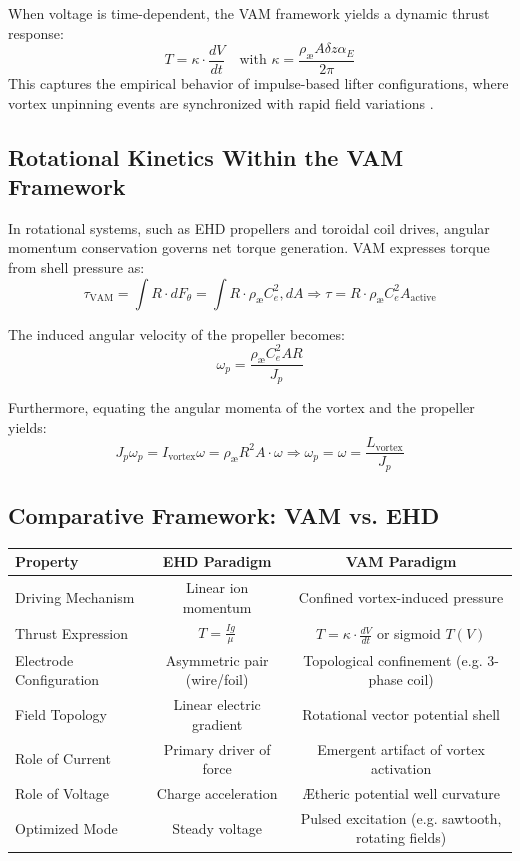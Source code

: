 \documentclass[a4paper,12pt]{article}
\begin{document}
When voltage is time-dependent, the VAM framework yields a dynamic thrust response:
\begin{equation}
\boxed{
T = \kappa \cdot \frac{dV}{dt}
\quad \text{with } \kappa = \frac{\rho_\text{\ae} A \delta z \alpha_E}{2\pi}
}
\end{equation}
This captures the empirical behavior of impulse-based lifter configurations, where vortex unpinning events are synchronized with rapid field variations \cite{vamthrustfit2025}.


\subsection{Rotational Kinetics Within the VAM Framework}
In rotational systems, such as EHD propellers and toroidal coil drives, angular momentum conservation governs net torque generation. VAM expresses torque from shell pressure as:
\begin{equation}
\tau_\text{VAM} = \int R \cdot dF_\theta = \int R \cdot \rho_\text{\ae} C_e^2 , dA \Rightarrow \tau = R \cdot \rho_\text{\ae} C_e^2 A_\text{active}
\end{equation}


The induced angular velocity of the propeller becomes:
\begin{equation}
\boxed{
\omega_p = \frac{\rho_\text{\ae} C_e^2 A R}{J_p}
}
\end{equation}


Furthermore, equating the angular momenta of the vortex and the propeller yields:
\begin{equation}
J_p \omega_p = I_\text{vortex} \omega = \rho_\text{\ae} R^2 A \cdot \omega
\Rightarrow \boxed{
\omega_p = \omega = \frac{L_\text{vortex}}{J_p}
}
\end{equation}


\subsection{Comparative Framework: VAM vs. EHD}
\begin{center}
\begin{tabular}{|l|c|c|}
\hline
\textbf{Property} & \textbf{EHD Paradigm} & \textbf{VAM Paradigm} \\
\hline
Driving Mechanism & Linear ion momentum & Confined vortex-induced pressure \\
Thrust Expression & $T = \frac{Ig}{\mu}$ & $T = \kappa \cdot \frac{dV}{dt}$ or sigmoid $T(V)$ \\
Electrode Configuration & Asymmetric pair (wire/foil) & Topological confinement (e.g. 3-phase coil) \\
Field Topology & Linear electric gradient & Rotational vector potential shell \\
Role of Current & Primary driver of force & Emergent artifact of vortex activation \\
Role of Voltage & Charge acceleration & Ætheric potential well curvature \\
Optimized Mode & Steady voltage & Pulsed excitation (e.g. sawtooth, rotating fields) \\
\hline
\end{tabular}
\end{center}
\end{document}
